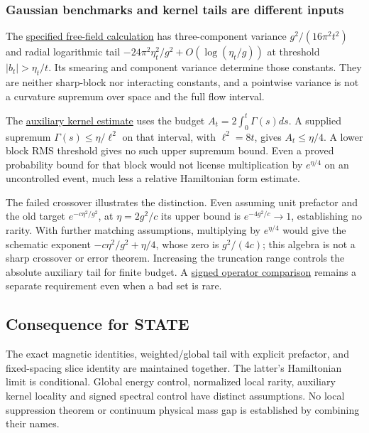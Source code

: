 \documentclass[11pt,a4paper]{article}
\begin{document}
\hypertarget{gaussian-benchmarks-and-kernel-tails-are-different-inputs}{%
\subsubsection{Gaussian benchmarks and kernel tails are different
inputs}\label{gaussian-benchmarks-and-kernel-tails-are-different-inputs}}

The
\href{flow-conjugation-truncation.md\#free-field-size-is-a-benchmark-not-a-supremum-bound}{specified
free-field calculation} has three-component variance
\(g^2/(16\pi^2t^2)\) and radial logarithmic tail
\(-24\pi^2\eta_t^2/g^2+O(\log(\eta_t/g))\) at threshold
\(|b_t|>\eta_t/t\). Its smearing and component variance determine those
constants. They are neither sharp-block nor interacting constants, and a
pointwise variance is not a curvature supremum over space and the full
flow interval.

The
\href{flow-conjugation-truncation.md\#absolute-tails-and-the-missing-metric-comparison}{auxiliary
kernel estimate} uses the budget \(A_t=2\int_0^t\Gamma(s)ds\). A
supplied supremum \(\Gamma(s)\le\eta/\ell^2\) on that interval, with
\(\ell^2=8t\), gives \(A_t\le\eta/4\). A lower block RMS threshold gives
no such upper supremum bound. Even a proved probability bound for that
block would not license multiplication by \(e^{\eta/4}\) on an
uncontrolled event, much less a relative Hamiltonian form estimate.

The failed crossover illustrates the distinction. Even assuming unit
prefactor and the old target \(e^{-c\eta^2/g^2}\), at \(\eta=2g^2/c\)
its upper bound is \(e^{-4g^2/c}\to1\), establishing no rarity. With
further matching assumptions, multiplying by \(e^{\eta/4}\) would give
the schematic exponent \(-c\eta^2/g^2+\eta/4\), whose zero is
\(g^2/(4c)\); this algebra is not a sharp crossover or error theorem.
Increasing the truncation range controls the absolute auxiliary tail for
finite budget. A \href{large-field-operator-inequality.md}{signed
operator comparison} remains a separate requirement even when a bad set
is rare.

\hypertarget{consequence-for-state}{%
\subsection{Consequence for STATE}\label{consequence-for-state}}

The exact magnetic identities, weighted/global tail with explicit
prefactor, and fixed-spacing slice identity are maintained together. The
latter's Hamiltonian limit is conditional. Global energy control,
normalized local rarity, auxiliary kernel locality and signed spectral
control have distinct assumptions. No local suppression theorem or
continuum physical mass gap is established by combining their names.
\end{document}
